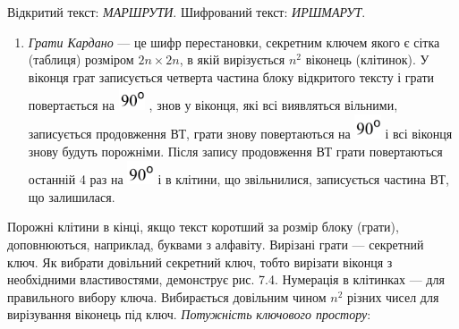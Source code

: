 {\centering
Відкритий текст: \textit{МАРШРУТИ}. Шифрований текст: \textit{ИРШМАРУТ}.
\par}


\bigskip

\liststyleWWviiiNumxli
\setcounter{saveenum}{\value{enumi}}
\begin{enumerate}
\setcounter{enumi}{\value{saveenum}}
\item \textit{Грати Кардано} --- це шифр перестановки, секретним ключем якого є
сітка (таблиця) розміром  ${2n\times 2n}$,  в якій вирізується  ${n^{{2}}}$
віконець (клітинок). У віконця грат записується четверта частина блоку
відкритого тексту і грати повертається на 
\includegraphics[width=0.3063in,height=0.2819in]{crypt-img/crypt-img72.png} ,
знов у віконця, які всі виявляться вільними, записується продовження  ВТ, грати
знову повертаються на 
\includegraphics[width=0.3063in,height=0.2819in]{crypt-img/crypt-img73.png}  і
всі віконця  знову будуть порожніми. Після запису продовження ВТ грати
повертаються останній 4 раз на 
\includegraphics[width=0.3063in,height=0.2819in]{crypt-img/crypt-img74.png}  і
в клітини, що звільнилися, записується частина ВТ, що залишилася. 
\end{enumerate}
Порожні клітини в кінці, якщо текст коротший за розмір блоку (грати),
доповнюються, наприклад, буквами з алфавіту. Вирізані грати --- секретний ключ.
Як вибрати довільний секретний ключ, тобто вирізати віконця з необхідними
властивостями, демонструє рис. 7.4. Нумерація в клітинках --- для правильного
вибору ключа. Вибирається довільним чином  ${n^{{2}}}$ різних чисел для
вирізування віконець під ключ. \textit{Потужність} \textit{ключового простору}:

